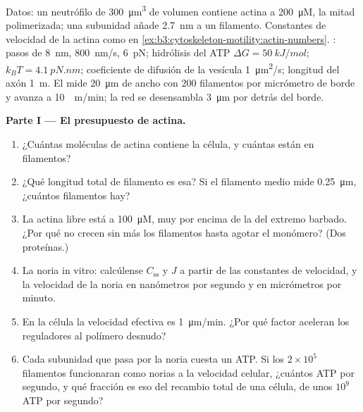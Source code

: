 \begin{problem}
\label{pb:b3:cytoskeleton-motility:1}
Datos: un neutrófilo de \qty{300}{\micro m^3} de volumen contiene actina
a \qty{200}{\micro M}, la mitad polimerizada; una subunidad añade
\qty{2.7}{nm} a un filamento. Constantes de velocidad de la actina como
en \cref{ex:b3:cytoskeleton-motility:actin-numbers}. : pasos de
\qty{8}{nm}, \qty{800}{nm/s},  \qty{6}{pN}; hidrólisis
del ATP $\Delta G = \qty{50}{kJ/mol}$; $k_{B}T = \qty{4.1}{pN.nm}$;
coeficiente de difusión de la vesícula \qty{1}{\micro m^2/s}; longitud
del axón \qty{1}{m}. El  mide \qty{20}{\micro m} de ancho con
$200$ filamentos por micrómetro de borde y avanza a \qty{10}{\micro
m/min}; la red se desensambla \qty{3}{\micro m} por detrás del borde.

\medskip
\noindent\textbf{Parte I --- El presupuesto de actina.}
\begin{enumerate}
  \item ¿Cuántas moléculas de actina contiene la célula, y cuántas están
        en filamentos?
  \item ¿Qué longitud total de filamento es esa? Si el filamento medio
        mide \qty{0.25}{\micro m}, ¿cuántos filamentos hay?
  \item La actina libre está a \qty{100}{\micro M}, muy por encima de la
         del extremo barbado. ¿Por qué no crecen sin
        más los filamentos hasta agotar el monómero? (Dos proteínas.)
  \item La noria in vitro: calcúlense $C_{\text{ss}}$ y $J$ a partir de
        las constantes de velocidad, y la velocidad de la noria en
        nanómetros por segundo y en micrómetros por minuto.
  \item En la célula la velocidad efectiva es \qty{1}{\micro m/min}. ¿Por
        qué factor aceleran los reguladores al polímero desnudo?
  \item Cada subunidad que pasa por la noria cuesta un ATP. Si los
        $2\times 10^{5}$ filamentos funcionaran como norias a la
        velocidad celular, ¿cuántos ATP por segundo, y qué fracción es
        eso del recambio total de una célula, de unos $10^{9}$ ATP por
        segundo?
\end{enumerate}


\end{problem}
